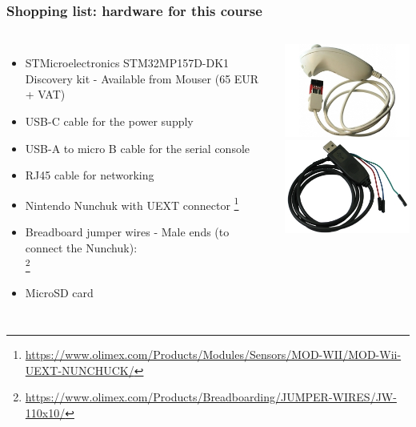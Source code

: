 \begin{frame}
\frametitle{Shopping list: hardware for this course}
  \begin{columns}
    \footnotesize
    \begin{itemize}
    \item STMicroelectronics STM32MP157D-DK1 Discovery kit -
      Available from Mouser (65 EUR + VAT)
    \item USB-C cable for the power supply
    \item USB-A to micro B cable for the serial console
    \item RJ45 cable for networking
    \item Nintendo Nunchuk with UEXT connector
      \footnote{\tiny \url{https://www.olimex.com/Products/Modules/Sensors/MOD-WII/MOD-Wii-UEXT-NUNCHUCK/}}
    \item Breadboard jumper wires - Male ends (to connect the Nunchuk): \\
      \footnote{\tiny \url{https://www.olimex.com/Products/Breadboarding/JUMPER-WIRES/JW-110x10/}}
    \item MicroSD card
    \end{itemize}
    \includegraphics[height=0.25\textheight]{common/nunchuk.jpg} \\
    \includegraphics[height=0.20\textheight]{common/usb-serial-cable-female.png} \\

\end{columns}
\end{frame}
